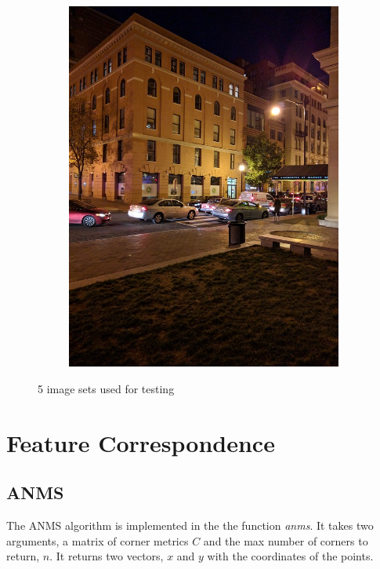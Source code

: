 \documentclass[12pt]{article}
\begin{document}
\begin{figure}[t!]
\begin{subfigure}[t]{0.3\textwidth}
        \includegraphics[width=\linewidth]{../Images/CustomSet2/3}
    \end{subfigure}

    \caption{5 image sets used for testing}
    \label{fig_set1}
\end{figure}


\section{Feature Correspondence} %

\subsection{ANMS}

The ANMS algorithm is implemented in the the function \textit{anms}. It takes two arguments, a matrix of corner metrics $C$ and the max number of corners to return, $n$. It returns two vectors, $x$ and $y$ with the coordinates of the points.
\end{document}
